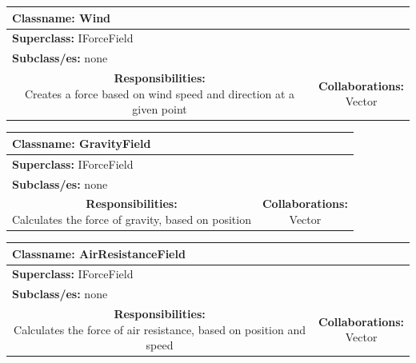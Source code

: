 \documentclass{article}
\begin{document}
\begin {center}
\begin{tabular}{|c|c|}
\hline
\multicolumn{2}{|l|}{\textbf{Classname:} Wind}\\
\hline
\multicolumn{2}{|l|}{\textbf{Superclass:} IForceField}\\
\multicolumn{2}{|l|}{\textbf{Subclass/es:} none}\\
\hline
\parbox[]{5cm}{\vspace{3px}\textbf{Responsibilities:} \\Creates a force based on wind speed and direction at a given point\vspace{3px}} & \parbox[]{5cm}{\textbf{Collaborations:}\\Vector}\\
\hline
 \end{tabular}\vspace{.4cm}

\begin{tabular}{|c|c|}
\hline
\multicolumn{2}{|l|}{\textbf{Classname:} GravityField}\\
\hline
\multicolumn{2}{|l|}{\textbf{Superclass:} IForceField}\\
\multicolumn{2}{|l|}{\textbf{Subclass/es:} none}\\
\hline
\parbox[]{5cm}{\vspace{3px}\textbf{Responsibilities:} \\Calculates the force of gravity, based on position\vspace{3px}} & \parbox[]{5cm}{\textbf{Collaborations:}\\Vector}\\
\hline
 \end{tabular}\vspace{.4cm}

\begin{tabular}{|c|c|}
\hline
\multicolumn{2}{|l|}{\textbf{Classname:} AirResistanceField}\\
\hline
\multicolumn{2}{|l|}{\textbf{Superclass:} IForceField}\\
\multicolumn{2}{|l|}{\textbf{Subclass/es:} none}\\
\hline
\parbox[]{5cm}{\vspace{3px}\textbf{Responsibilities:} \\Calculates the force of air resistance, based on position and speed\vspace{3px}} & \parbox[]{5cm}{\textbf{Collaborations:}\\Vector}\\
\hline
 \end{tabular}\vspace{.4cm}


\end{center}
\end{document}
